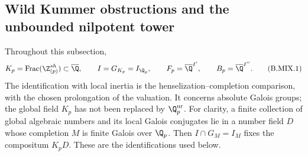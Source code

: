 \subsection{Wild Kummer obstructions and the unbounded nilpotent tower}

Throughout this subsection,
\[
 K_p=\operatorname{Frac}(\Z_{(p)}^{sh})\subset\overline\Q,
 \qquad I=G_{K_p}=I_{\Q_p},\qquad
 F_p=\overline\Q^{I'},\qquad B_p=\overline\Q^{I''}.
                                                        \tag{B.MIX.1}
\]
The identification with local inertia is the henselization--completion
comparison, with the chosen prolongation of the valuation. It concerns
absolute Galois groups; the global field \(K_p\) has not been replaced
by \(\Q_p^{\mathrm{ur}}\). For clarity, a finite collection of global
algebraic numbers and its local Galois conjugates lie in a number field
\(D\) whose completion \(M\) is finite Galois over \(\Q_p\).
Then \(I\cap G_M=I_M\) fixes the compositum \(K_pD\).
These are the identifications used below.

